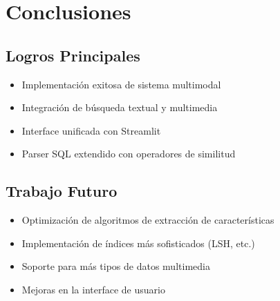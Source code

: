 \documentclass[a4paper,12pt]{report}
\begin{document}
\chapter{Conclusiones}
\section{Logros Principales}
\begin{itemize}
\item Implementación exitosa de sistema multimodal
\item Integración de búsqueda textual y multimedia
\item Interface unificada con Streamlit
\item Parser SQL extendido con operadores de similitud
\end{itemize}

\section{Trabajo Futuro}
\begin{itemize}
\item Optimización de algoritmos de extracción de características
\item Implementación de índices más sofisticados (LSH, etc.)
\item Soporte para más tipos de datos multimedia
\item Mejoras en la interface de usuario
\end{itemize}
\end{document}
